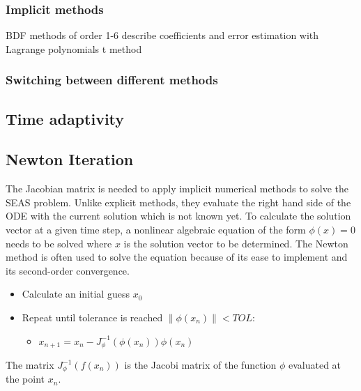 \subsubsection{Implicit methods}
BDF methods of order 1-6
describe coefficients and error estimation with Lagrange polynomials
t method

\subsubsection{Switching between different methods}

\subsection{Time adaptivity}

\subsection{Newton Iteration}
\label{ssec:ConvergenceNewtonIteration}
The Jacobian matrix is needed to apply implicit numerical methods to solve the SEAS problem. Unlike explicit methods, they evaluate the right hand side of the ODE with the current solution which is not known yet. To calculate the solution vector at a given time step, a nonlinear algebraic equation of the form $\phi(x) = 0$ needs to be solved where $x$ is the solution vector to be determined. The Newton method is often used to solve the equation because of its ease to implement and its second-order convergence. 

\begin{itemize}
	\item Calculate an initial guess $x_0$
	\item Repeat until tolerance is reached $\|\phi(x_n)\| < TOL$: 
	\begin{itemize}
		\item $x_{n+1} = x_n - J_\phi^{-1}(\phi(x_n)) \phi(x_n)$
	\end{itemize} 
\end{itemize}

The matrix $J_\phi^{-1}(f(x_n))$ is the Jacobi matrix of the function $\phi$ evaluated at the point $x_n$. \\

